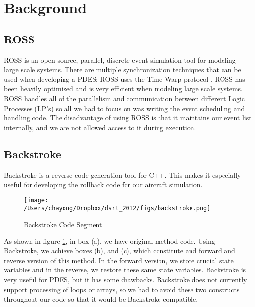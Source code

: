 \section{Background}

\subsection{ROSS}
ROSS \cite{carros} is an open source, parallel, discrete event simulation tool for modeling large scale systems.
There are multiple synchronization techniques that can be used when developing a PDES; ROSS uses the Time Warp protocol \cite{jefvir}.
ROSS has been heavily optimized and is very efficient when modeling large scale systems.
ROSS handles all of the parallelism and communication between different Logic Processes (LP's)
so all we had to focus on was writing the event scheduling and handling code.
The disadvantage of using ROSS is that it maintains our event list internally, and we are not allowed access to it during execution.

\subsection{Backstroke}
Backstroke \cite{vulthe} is a reverse-code generation tool for C++.
This makes it especially useful for developing the rollback code for our aircraft simulation. 


\begin{figure} [htd]
\centering
\texttt{[image: /Users/chayong/Dropbox/dsrt\_2012/figs/backstroke.png]}
\caption{Backstroke Code Segment}
\label{fig:backstroke}
\end{figure}


As shown in figure \ref{fig:backstroke}, in box (a), we have original method code. Using Backstroke, we achieve boxes (b), and (c), 
which constitute and forward and reverse version of this method. 
In the forward version, we store crucial state variables and in the reverse, we restore these same state variables. 
Backstroke is very useful for PDES, but it has some drawbacks. 
Backstroke does not currently support processing of loops or arrays, so we had to avoid these two constructs throughout our code
so that it would be Backstroke compatible.